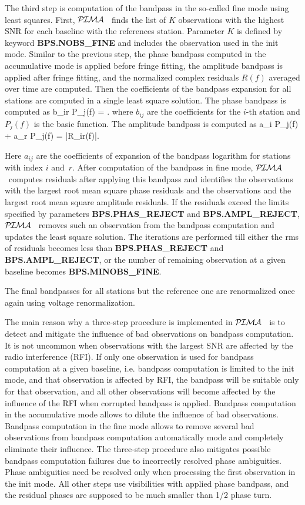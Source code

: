 \documentclass[11pt]{article}
\newcommand{\Blb}[1]{\textcolor{Dblue}{\bf #1}}
\newcommand{\PIMA}{\textcolor{Dgreen}{$\cal P\hspace{-0.067em}I\hspace{-0.067em}M\hspace{-0.067em}A$} }
\begin{document}
  The third step is computation of the bandpass in the so-called 
{\sc fine} mode using least squares. First, \PIMA\ finds the list of $K$ 
observations with the highest SNR for each baseline with the references 
station. Parameter $K$ is defined by keyword \Blb{BPS.NOBS\_FINE} and 
includes the observation used in the {\sc init} mode. Similar to the 
previous step, the phase bandpass computed in the accumulative mode is 
applied before fringe fitting, the amplitude bandpass is applied after 
fringe fitting, and the normalized complex residuals $R(f)$ averaged 
over time are computed. Then the coefficients of the bandpass expansion 
for all stations are computed in a single least square solution. 
The phase bandpass is computed as
%
\beq
    \sum b_{ir} P_j(f) = .
%
where $b_{ij}$ are the coefficients for the $i$-th station and $P_j(f)$
is the basic function. The amplitude bandpass is computed as
%
\beq
    \sum a_{i} P_j(f) + a_{r} P_j(f) = \log |R_{ir}(f)|.

  Here $a_{ij}$ are the coefficients of expansion of the bandpass logarithm
for stations with index $i$ and~$r$. After computation of the bandpass in 
{\sc fine} mode, \PIMA\ computes residuals after applying this bandpass 
and identifies the observations with the largest root mean square phase 
residuals and the observations and the largest root mean square amplitude 
residuals. If the residuals exceed the limits specified by parameters 
\Blb{BPS.PHAS\_REJECT} and \Blb{BPS.AMPL\_REJECT}, \PIMA\ removes such 
an observation from the bandpass computation and updates the least square 
solution. The iterations are performed till either the rms of residuals 
becomes less than \Blb{BPS.PHAS\_REJECT} and \Blb{BPS.AMPL\_REJECT}, or 
the number of remaining observation at a given baseline becomes
\Blb{BPS.MINOBS\_FINE}.

  The final bandpasses for all stations but the reference one are 
renormalized once again using voltage renormalization.

  The main reason why a three-step procedure is implemented in \PIMA\ is to
detect and mitigate the influence of bad observations on bandpass computation.
It is not uncommon when observations with the largest SNR are affected
by the radio interference (RFI). If only one observation is used for 
bandpass computation at a given baseline, i.e. bandpass computation is 
limited to the {\sc init} mode, and that observation is affected by RFI, 
the bandpass will be suitable only for that observation, and all other 
observations will become affected by the influence of the RFI when corrupted 
bandpass is applied. Bandpass computation in the {\sc accumulative} mode 
allows to dilute the influence of bad observations. Bandpass computation in 
the {\sc fine} mode allows to remove several bad observations from bandpass 
computation automatically mode and completely eliminate their influence. 
The three-step procedure also mitigates possible bandpass computation failures
due to incorrectly resolved phase ambiguities. Phase ambiguities need be 
resolved only when processing the first observation in the {\sc init} mode. 
All other steps use visibilities with applied phase bandpass, and the 
residual phases are supposed to be much smaller than 1/2 phase turn.
\end{document}
